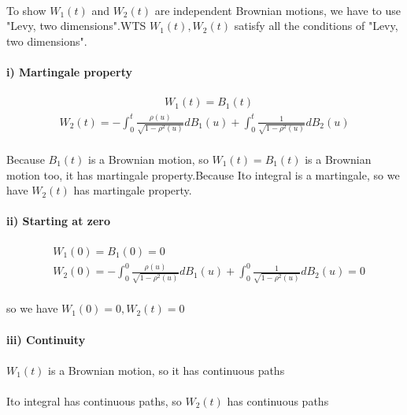 \documentclass{article}
\begin{document}
\paragraph{}{To show $W_1(t)$ and $W_2(t)$ are independent Brownian motions, we have to use "Levy, two dimensions".WTS $W_1(t),W_2(t)$ satisfy all the conditions of "Levy, two dimensions".}
\paragraph{i) Martingale property}
\begin{align*}
  &W_1(t)= B_1(t)
 \end{align*}
 \begin{align*}
   W_2(t)=-\int_{0}^{t}\frac{\rho(u)}{\sqrt{1-\rho^2(u)}}dB_1(u)+\int_{0}^{t}\frac{1}{\sqrt{1-\rho^2(u)}}dB_2(u)
\end{align*}
\paragraph{}{Because $B_1(t)$ is a Brownian motion, so $W_1(t)= B_1(t)$ is a Brownian motion too, it has martingale property.Because Ito integral is a martingale, so we have $W_2(t)$ has martingale property.   }
\paragraph{ii) Starting at zero}
\begin{align*}
  &W_1(0)= B_1(0)=0\\
  & W_2(0)=-\int_{0}^{0}\frac{\rho(u)}{\sqrt{1-\rho^2(u)}}dB_1(u)+\int_{0}^{0}\frac{1}{\sqrt{1-\rho^2(u)}}dB_2(u)=0
\end{align*}
\paragraph{}{so we have $W_1(0)=0,W_2(t)=0$ }
\paragraph{iii) Continuity}
\paragraph{}{$W_1(t)$ is a Brownian motion, so it has continuous paths}
\paragraph{}{Ito integral has continuous paths, so $W_2(t)$ has continuous paths}
\end{document}
